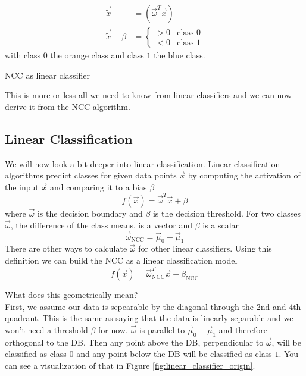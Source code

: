 \begin{minipage}{.45\textwidth}
  {
  \centering
\begin{align}
  \vec{\tilde{x}} &= \left(\vec{{\omega}}^T\vec{x}\right) \\
  \vec{\tilde{x}} - \beta &= \left\{\begin{matrix}
    > 0 & \text{class } 0 \\
    < 0 & \text{class } 1
  \end{matrix}\right.
\end{align}
  }
with class $0$ the orange class and class $1$ the blue class.
\end{minipage}
\begin{minipage}{.45\textwidth}
  \centering
  
  \caption{NCC as linear classifier}
  \label{fig:ncc_linear_classifier}
\end{minipage}

This is more or less all we need to know from linear classifiers and we can now derive it from the NCC algorithm.

\subsection{Linear Classification}
We will now look a bit deeper into linear classification.
Linear classification algorithms predict classes for given data points $\vec{x}$ by computing the activation of the input $\vec{x}$ and comparing it to a bias $\beta$
\begin{equation}
  f(\vec{x}) = \vec{\omega}^T\vec{x} + \beta
  \label{eq:linear_classification}
\end{equation}
where $\vec{\omega}$ is the decision boundary and $\beta$ is the decision threshold.
For two classes $\vec{\omega}$, the difference of the class means, is a vector and $\beta$ is a scalar
\begin{equation}
  \vec{\omega}_{\text{NCC}} = \vec{\mu}_0 - \vec{\mu}_1
\end{equation}
There are other ways to calculate $\vec{\omega}$ for other linear classifiers.
Using this definition we can build the NCC as a linear classification model
\begin{equation}
  f(\vec{x}) = \vec{\omega}_{\text{NCC}}^T\vec{x} + \beta_{\text{NCC}}
\end{equation}

What does this geometrically mean?\\
First, we assume our data is sepearable by the diagonal through the 2nd and 4th quadrant. This is the same as saying that the data is linearly separable and we won't need a threshold $\beta$ for now.
$\vec{\omega}$ is parallel to ${\vec{\mu}_0-\vec{\mu}_1}$ and therefore orthogonal to the DB.
Then any point above the DB, perpendicular to $\vec{\omega}$, will be classified as class $0$ and any point below the DB will be classified as class $1$. You can see a visualization of that in Figure \ref{fig:linear_classifier_origin}.

